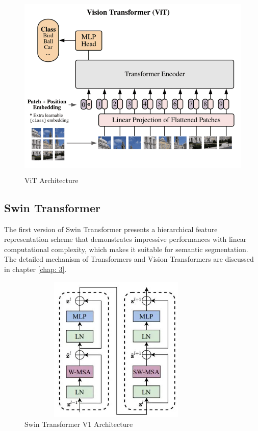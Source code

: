 \begin{figure}[ht]
\includegraphics[width=13.5cm, height=9cm]{images/vision transformer.png}
\centering
\caption{ViT Architecture}
\label{fig:vit}
\end{figure}

\subsection{Swin Transformer}
The first version of Swin Transformer \cite{swin-v1} presents a hierarchical feature representation scheme that demonstrates impressive performances with linear computational complexity, which makes it suitable for semantic segmentation. The detailed mechanism of Transformers and Vision Transformers are discussed in chapter \ref{chap: 3}.

\FloatBarrier
\begin{figure}[ht]
\includegraphics[width=9.5cm, height=7cm]{images/swin-architecture.jpg}
\centering
\caption{Swin Transformer V1 Architecture}
\label{fig:swin architecture}
\end{figure}

